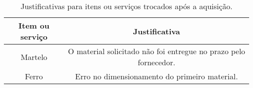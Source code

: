 \begin{landscape}
\begin{table}[htpb]
\begin{center}
\caption{Justificativas para itens ou serviços trocados após a aquisição.}
\begin{tabular}{|c|c|} \hline
\textbf{Item ou serviço} & \textbf{Justificativa}  \\ \hline 
    Martelo &
    O material solicitado não foi entregue no prazo pelo fornecedor. \\ \hline
    Ferro &
    Erro no dimensionamento do primeiro material. \\ \hline
\end{tabular}
\end{center}
\end{table}

\end{landscape}